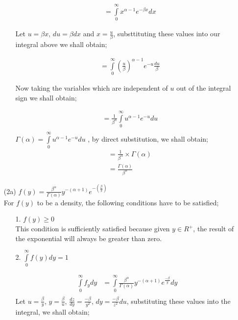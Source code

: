 \documentclass[12pt,a4paper]{article}
\begin{document}
\begin{itemize}
\begin{itemize}
\begin{align*}
&= \int\limits_0^\infty {x^{\alpha - 1} e^{ -\beta x}dx}
\end{align*}

Let $u=\beta x$, $du=\beta dx$ and $x=\frac{u}{\beta}$, substtituting these values into our integral above we shall obtain;

\begin{align*}
&= \int\limits_0^\infty {\left(\frac{u}{\beta}\right)^{\alpha-1} e^{ -u} \frac{du}{\beta}}
\end{align*}

Now taking the variables which are independent of $u$ out of the integral sign we shall obtain;


\begin{align*}
&=\frac{1}{\beta^{\alpha}}\int\limits_0^\infty {u^{\alpha-1} e^{ -u}du}\\
\end{align*}
 $ \Gamma \left( \alpha \right) = \int\limits_0^\infty {u^{\alpha - 1} e^{ -u} du}$ , by direct substitution, we shall obtain; \\
\begin{align*}
&=\frac{1}{\beta^{\alpha}}\times \Gamma \left( \alpha\right)\\
&=\frac{\Gamma \left( \alpha\right)}{\beta^{\alpha}}
\end{align*}

\end{itemize}
\newpage
\item[(2a)] $f\left(y\right)=\frac{\beta^{\alpha}}{\Gamma \left(\alpha \right)} y^{-\left(\alpha+1\right)}e^{-\left(\frac{\beta}{y}\right)}$\\
For $f\left(y\right)$ to be a density, the following conditions have to be satisfied;\\
\begin{itemize}
\item[1.] $f\left(y\right)\geq0$\\This condition is sufficiently satisfied because given $y \in R^{+} $, the result of the exponential will always be greater than zero.

\item[2.] $\int\limits_{0}^{\infty} f\left(y\right) dy=1$

\begin{align*}
\int\limits_0^\infty f_{y}dy&=\int\limits_{0}^{\infty}\frac{\beta^{\alpha}}{\Gamma \left(\alpha \right)} y^{-\left(\alpha+1\right)}e^{\frac{-\beta}{y}}dy\\
\end{align*}
Let $u=\frac{\beta}{y}$, $y=\frac{\beta}{u}$, $\frac{dz}{dy}=\frac{-\beta}{y^{2}}$, $dy=\frac{-\beta}{z^{2}}du$, substituting these values into the integral, we shall obtain;\\


\end{itemize}
\end{itemize}
\end{document}
